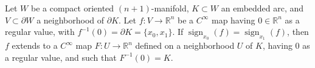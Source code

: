 Let $W$ be a compact oriented $(n+1)$-manifold, $K \subset W$ an embedded arc, and $V \subset \partial W$ a neighborhood of $\partial K$. Let $f: V \to \mathbb{R}^n$ be a $C^\infty$ map having $0 \in \mathbb{R}^n$ as a regular value, with $f^{-1}(0) = \partial K = \{x_0, x_1\}$. If $\operatorname{sign}_{x_0}(f) = \operatorname{sign}_{x_1}(f)$, then $f$ extends to a $C^\infty$ map $F: U \to \mathbb{R}^n$ defined on a neighborhood $U$ of $K$, having $0$ as a regular value, and such that $F^{-1}(0) = K$.
